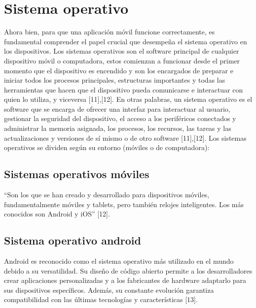 
\section{Sistema operativo}

Ahora bien, para que una aplicación móvil funcione correctamente, es fundamental comprender el papel crucial que desempeña el sistema operativo en los dispositivos.
Los sistemas operativos son el software principal de cualquier dispositivo móvil o computadora, estos comienzan a funcionar desde el primer momento que el dispositivo es encendido y son los encargados de preparar e iniciar todos los procesos principales, estructuras importantes y todas las herramientas que hacen que el dispositivo pueda comunicarse e interactuar con quien lo utiliza, y viceversa [11],[12].
En otras palabras, un sistema operativo es el software que se encarga de ofrecer una interfaz para interactuar al usuario, gestionar la seguridad del dispositivo, el acceso a los periféricos conectados y administrar la memoria asignada, los procesos, los recursos, las tareas y las actualizaciones y versiones de sí mismo o de otro software [11],[12]. 
Los sistemas operativos se dividen según su entorno (móviles o de computadora):

\subsection{Sistemas operativos móviles}

“Son los que se han creado y desarrollado para dispositivos móviles, fundamentalmente móviles y tablets, pero también relojes inteligentes. Los más conocidos son Android y iOS” [12].

\subsection{Sistema operativo android}

\begin{list}{}%
    {\setlength{\leftmargin}{1cm}\setlength{\rightmargin}{1cm}}
    \item\relax
    \small
    Android es reconocido como el sistema operativo más utilizado en el mundo debido a su versatilidad. Su diseño de código abierto permite a los desarrolladores crear aplicaciones personalizadas y a los fabricantes de hardware adaptarlo para sus dispositivos específicos. Además, su constante evolución garantiza compatibilidad con las últimas tecnologías y características [13].
    \end{list}

